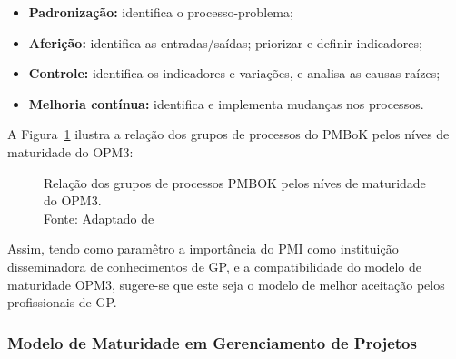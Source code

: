     \begin{itemize}
      \item \textbf{Padronização:} identifica o processo-problema;
      \item \textbf{Aferição:} identifica as entradas/saídas; priorizar e definir indicadores;
      \item \textbf{Controle:} identifica os indicadores e variações, e analisa as causas raízes;
      \item \textbf{Melhoria contínua: } identifica e implementa mudanças nos processos.
    \end{itemize}

    A Figura~\ref{pmbok_opm3} ilustra a relação dos grupos de processos do PMBoK pelos níves de maturidade do OPM3:

    \begin{figure}[!h]
      \centering
      \caption{Relação dos grupos de processos PMBOK pelos níves de maturidade do OPM3. \\ Fonte: Adaptado de \cite{pmiopm2013}}
      \label{pmbok_opm3}
    \end{figure}

    Assim, tendo como paramêtro a importância do PMI como instituição disseminadora de conhecimentos de GP, e a compatibilidade do modelo de maturidade OPM3, sugere-se que este seja o modelo de melhor aceitação pelos profissionais de GP.

  \subsubsection{Modelo de Maturidade em Gerenciamento de Projetos}


